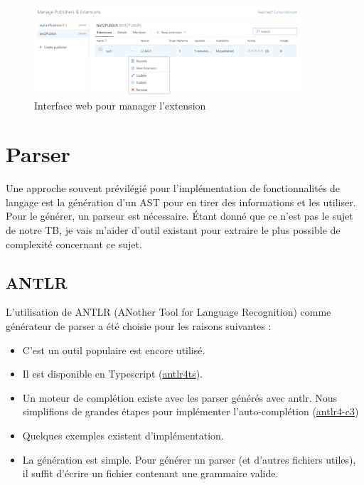 \documentclass[
    iict, %
    il, %
]{heig-tb}
\begin{document}
\begin{figure}[!ht]
    \begin{center}
        \includegraphics[width=10cm]{assets/figures/manage-publisher.png}
    \end{center}
    \caption[Interface web pour manager l'extension]{\label{manage-publisher} Interface web pour manager l'extension}
\end{figure}




\section{Parser}
Une approche souvent prévilégié pour l’implémentation de fonctionnalités de langage est la génération d’un AST pour en tirer des informations et les utiliser. Pour le générer, un parseur est nécessaire. Étant donné que ce n’est pas le sujet de notre TB, je vais m’aider d’outil existant pour extraire le plus possible de complexité concernant ce sujet.

\subsection{ANTLR}
L’utilisation de ANTLR (ANother Tool for Language Recognition) comme générateur de parser a été choisie pour les raisons suivantes :
\begin{itemize}
    \item C’est un outil populaire est encore utilisé.
    \item Il est disponible en Typescript (\href{https://github.com/tunnelvisionlabs/antlr4ts}{antlr4ts}).
    \item Un moteur de complétion existe avec les parser générés avec antlr. Nous simplifions de grandes étapes pour implémenter l’auto-complétion (\href{https://github.com/mike-lischke/antlr4-c3}{antlr4-c3})
    \item Quelques exemples existent d’implémentation.
    \item La génération est simple. Pour générer un parser (et d’autres fichiers utiles), il suffit d’écrire un fichier contenant une grammaire valide.
\end{itemize}
\end{document}
